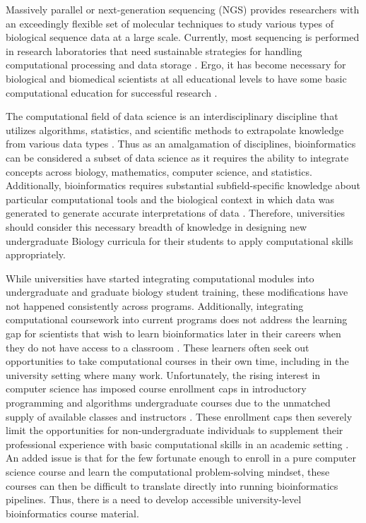 Massively parallel or next-generation sequencing (NGS) provides researchers with an exceedingly flexible set of molecular techniques to study various types of biological sequence data at a large scale. Currently, most sequencing is performed in research laboratories that need sustainable strategies for handling computational processing and data storage \cite{barone2017,leonelli2019,marx2013,pal2020,stephens2015}. Ergo, it has become necessary for biological and biomedical scientists at all educational levels to have some basic computational education for successful research \cite{attwood2019,pevzner2009a,rubinstein2014,tan2009}. 

The computational field of data science is an interdisciplinary discipline that utilizes algorithms, statistics, and scientific methods to extrapolate knowledge from various data types \cite{attwood2019,cao2017,getoor2019,stephens2015}. Thus as an amalgamation of disciplines, bioinformatics can be considered a subset of data science as it requires the ability to integrate concepts across biology, mathematics, computer science, and statistics. Additionally, bioinformatics requires substantial subfield-specific knowledge about particular computational tools and the biological context in which data was generated to generate accurate interpretations of data \cite{attwood2019,leonelli2019,marx2013,pal2020,rubinstein2014,tan2009}. Therefore, universities should consider this necessary breadth of knowledge in designing new undergraduate Biology curricula for their students to apply computational skills appropriately. 

While universities have started integrating computational modules into undergraduate and graduate biology student training, these modifications have not happened consistently across programs. Additionally, integrating computational coursework into current programs does not address the learning gap for scientists that wish to learn bioinformatics later in their careers when they do not have access to a classroom \cite{attwood2019,barone2017,zhan2019}. These learners often seek out opportunities to take computational courses in their own time, including in the university setting where many work. Unfortunately, the rising interest in computer science has imposed course enrollment caps in introductory programming and algorithms undergraduate courses due to the unmatched supply of available classes and instructors \cite{brodley2022,nager2016,shein2019,camp2015,jaggars2016}. These enrollment caps then severely limit the opportunities for non-undergraduate individuals to supplement their professional experience with basic computational skills in an academic setting \cite{jaggars2016,brodley2022,nager2016,camp2015,backofen2006}. An added issue is that for the few fortunate enough to enroll in a pure computer science course and learn the computational problem-solving mindset, these courses can then be difficult to translate directly into running bioinformatics pipelines. Thus, there is a need to develop accessible university-level bioinformatics course material.

